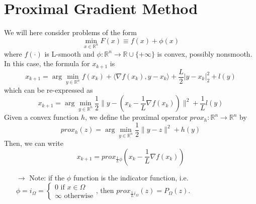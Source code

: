 \documentclass[12pt, openany]{report}
\theoremstyle{definition}
\begin{document}
\section{Proximal Gradient Method}
We will here consider problems of the form 
\begin{equation}
    \min_{x\in \mathbb{R}^n} F(x) \equiv f(x) + \phi(x)
\end{equation}
where \(f(\cdot)\) is L-smooth and \(\phi :\mathbb{R}^n\rightarrow \mathbb{R}\cup \{+\infty\}\) is convex, possibly nonsmooth. \\
In this case, the formula for \(x_{k+1}\) is 
\begin{equation}
    x_{k+1} = \arg\min_{y\in \mathbb{R}^n} f(x_k) + \langle \nabla f(x_k),y-x_k\rangle + \frac{L}{2}\lvert y-x_k\rvert_2^2 + l(y)
\end{equation}
which can be re-expressed as 
\begin{equation}
    x_{k+1} = \arg\min_{y\in \mathbb{R}^n} \frac{1}{2}\lVert y-(x_k-\frac{1}{L}\nabla f(x_k))\rVert^2+\frac{1}{L}l(y)
\end{equation}
Given a convex function \(h\), we define the proximal operator \(prox_h:\mathbb{R}^n\rightarrow\mathbb{R}^n\) by
\begin{equation}
    prox_h(z) = \arg \min_{y\in \mathbb{R}^n}\frac{1}{2}\lVert y-z\rVert^2+h(y)
\end{equation}
Then, we can write
\begin{equation}
    x_{k+1} = prox_{\frac{1}{L}\phi}\left(x_k-\frac{1}{L}\nabla f(x_k)\right)
\end{equation}
\begin{itemize}
    \item [\(\rightarrow\)] Note: if the \(\phi\) function is the indicator function, i.e. \(\phi=i_\Omega = \begin{cases}
        0 \text{ if } x\in \Omega\\ \infty \text{ otherwise}
    \end{cases}\), then \(prox_{\frac{1}{L}i_\Omega}(z) = P_\Omega(z)\).
\end{itemize}
\end{document}
